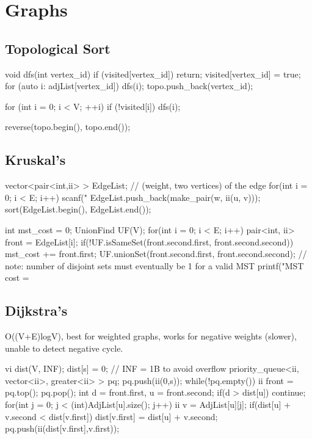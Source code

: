 \documentclass{article}
\begin{document}
\section{Graphs}
\subsection{Topological Sort}
\begin{mylisting}{}
void dfs(int vertex_id) {
	if (visited[vertex_id]) return;
	visited[vertex_id] = true;
	for (auto i: adjList[vertex_id]) {
		dfs(i);
	}
	topo.push_back(vertex_id);
}

for (int i = 0; i < V; ++i)
	if (!visited[i]) dfs(i);
	
reverse(topo.begin(), topo.end());
\end{mylisting}

\subsection{Kruskal's}
\begin{mylisting}{}
vector<pair<int,ii> > EdgeList;	// (weight, two vertices) of the edge
for(int i = 0; i < E; i++){
	scanf("%
	EdgeList.push_back(make_pair(w, ii(u, v)));
}
sort(EdgeList.begin(), EdgeList.end());

int mst_cost = 0;
UnionFind UF(V);
for(int i = 0; i < E; i++){
	pair<int, ii> front = EdgeList[i];
	if(!UF.isSameSet(front.second.first, front.second.second)){
		mst_cost += front.first;
		UF.unionSet(front.second.first, front.second.second);
	}
} // note: number of disjoint sets must eventually be 1 for a valid MST
printf("MST cost = %
\end{mylisting}

\subsection{Dijkstra's}
O((V+E)logV), best for weighted graphs, works for negative weights (slower), unable to detect negative cycle.
\begin{mylisting}{}
vi dist(V, INF); dist[s] = 0;		// INF = 1B to avoid overflow
priority_queue<ii, vector<ii>, greater<ii> > pq; pq.push(ii(0,s));
while(!pq.empty()){
	ii front = pq.top(); pq.pop();	
	int d = front.first, u = front.second;
	if(d > dist[u]) continue;		
	for(int j = 0; j < (int)AdjList[u].size(); j++){
		ii v = AdjList[u][j];	
		if(dist[u] + v.second < dist[v.first]){
			dist[v.first] = dist[u] + v.second;	
			pq.push(ii(dist[v.first],v.first));
		}
	}
}
\end{mylisting}
\end{document}
